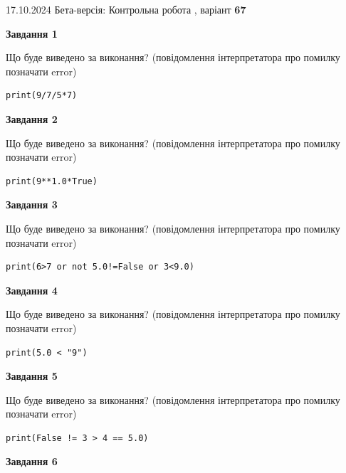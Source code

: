 \documentclass[12pt, ukrainian]{article}
\begin{document}
{\Large{17.10.2024 Бета-версія: Контрольна робота , варіант  \No \textbf { 67 }\par}}
{
\begin {large}
{\begin {center}\textbf{Завдання 1}\end {center}}

Що буде виведено за виконання? (повідомлення інтерпретатора про помилку позначати error)\par
\begin{verbatim}
print(9/7/5*7)
\end{verbatim}

{\begin {center}\textbf{Завдання 2}\end {center}}

Що буде виведено за виконання? (повідомлення інтерпретатора про помилку позначати error)\par
\begin{verbatim}
print(9**1.0*True)
\end{verbatim}

{\begin {center}\textbf{Завдання 3}\end {center}}

Що буде виведено за виконання? (повідомлення інтерпретатора про помилку позначати error)\par
\begin{verbatim}
print(6>7 or not 5.0!=False or 3<9.0)
\end{verbatim}

{\begin {center}\textbf{Завдання 4}\end {center}}

Що буде виведено за виконання? (повідомлення інтерпретатора про помилку позначати error)\par
\begin{verbatim}
print(5.0 < "9")
\end{verbatim}

{\begin {center}\textbf{Завдання 5}\end {center}}

Що буде виведено за виконання? (повідомлення інтерпретатора про помилку позначати error)\par
\begin{verbatim}
print(False != 3 > 4 == 5.0)
\end{verbatim}

{\begin {center}\textbf{Завдання 6}\end {center}}


\end{large}}
\end{document}
